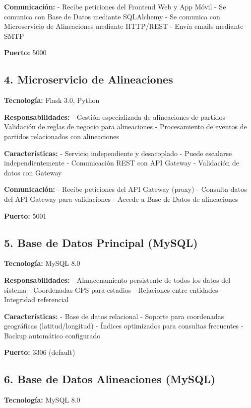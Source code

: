 \documentclass[
  spanish,
  11pt,
  letterpaper,
]{book}
\begin{document}
\textbf{Comunicación:} - Recibe peticiones del Frontend Web y App Móvil
- Se comunica con Base de Datos mediante SQLAlchemy - Se comunica con
Microservicio de Alineaciones mediante HTTP/REST - Envía emails mediante
SMTP

\textbf{Puerto:} 5000

\subsection{4. Microservicio de
Alineaciones}\label{microservicio-de-alineaciones-1}

\textbf{Tecnología:} Flask 3.0, Python

\textbf{Responsabilidades:} - Gestión especializada de alineaciones de
partidos - Validación de reglas de negocio para alineaciones -
Procesamiento de eventos de partidos relacionados con alineaciones

\textbf{Características:} - Servicio independiente y desacoplado - Puede
escalarse independientemente - Comunicación REST con API Gateway -
Validación de datos con Gateway

\textbf{Comunicación:} - Recibe peticiones del API Gateway (proxy) -
Consulta datos del API Gateway para validaciones - Accede a Base de
Datos de alineaciones

\textbf{Puerto:} 5001

\subsection{5. Base de Datos Principal
(MySQL)}\label{base-de-datos-principal-mysql}

\textbf{Tecnología:} MySQL 8.0

\textbf{Responsabilidades:} - Almacenamiento persistente de todos los
datos del sistema - Coordenadas GPS para estadios - Relaciones entre
entidades - Integridad referencial

\textbf{Características:} - Base de datos relacional - Soporte para
coordenadas geográficas (latitud/longitud) - Índices optimizados para
consultas frecuentes - Backup automático configurado

\textbf{Puerto:} 3306 (default)

\subsection{6. Base de Datos Alineaciones
(MySQL)}\label{base-de-datos-alineaciones-mysql}

\textbf{Tecnología:} MySQL 8.0
\end{document}
